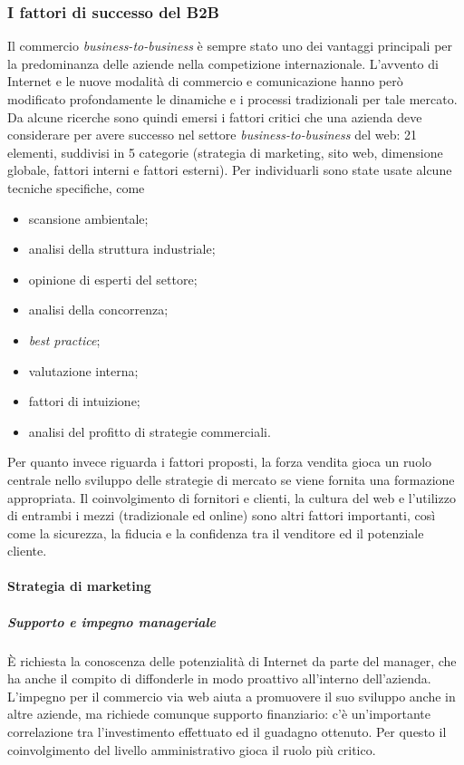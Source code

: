 \subsubsection{I fattori di successo del B2B}
Il commercio \textit{business-to-business} è sempre stato uno dei vantaggi principali per la predominanza delle aziende nella competizione internazionale. L'avvento di Internet e le nuove modalità di commercio e comunicazione hanno però modificato profondamente le dinamiche e i processi tradizionali per tale mercato. Da alcune ricerche sono quindi emersi i fattori critici che una azienda deve considerare per avere successo nel settore \textit{business-to-business} del web: 21 elementi, suddivisi in 5 categorie (strategia di marketing, sito web, dimensione globale, fattori interni e fattori esterni). Per individuarli sono state usate alcune tecniche specifiche, come
\begin{itemize}
	\item scansione ambientale;
	\item analisi della struttura industriale;
	\item opinione di esperti del settore;
	\item analisi della concorrenza;
	\item \textit{best practice};
	\item valutazione interna;
	\item fattori di intuizione;
	\item analisi del profitto di strategie commerciali.
\end{itemize}
Per quanto invece riguarda i fattori proposti, la forza vendita gioca un ruolo centrale nello sviluppo delle strategie di mercato se viene fornita una formazione appropriata. Il coinvolgimento di fornitori e clienti, la cultura del web e l'utilizzo di entrambi i mezzi (tradizionale ed online) sono altri fattori importanti, così come la sicurezza, la fiducia e la confidenza tra il venditore ed il potenziale cliente.

\paragraph{Strategia di marketing}
\subparagraph{Supporto e impegno manageriale}
È richiesta la conoscenza delle potenzialità di Internet da parte del manager, che ha anche il compito di diffonderle in modo proattivo all'interno dell'azienda. L'impegno per il commercio via web aiuta a promuovere il suo sviluppo anche in altre aziende, ma richiede comunque supporto finanziario: c'è un'importante correlazione tra l'investimento effettuato ed il guadagno ottenuto. Per questo il coinvolgimento del livello amministrativo gioca il ruolo più critico.

